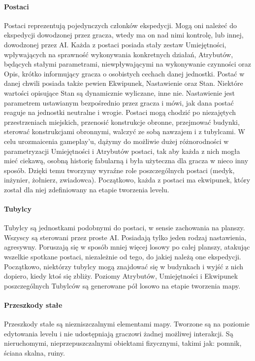 \documentclass[licencjacka]{pracamgr}
\begin{document}
    \paragraph{Postaci}
      Postaci reprezentują pojedynczych członków ekspedycji. Mogą oni należeć do ekspedycji dowodzonej przez gracza,
      wtedy ma on nad nimi kontrolę, lub innej, dowodzonej przez AI. Każda z postaci posiada stały zestaw Umiejętności,
      wpływających na sprawność wykonywania konkretnych działań, Atrybutów, będących stałymi parametrami, niewpływającymi
      na wykonywanie czynności oraz Opis, krótko informujący gracza o osobistych cechach danej jednostki. Postać w danej
      chwili posiada także pewien Ekwipunek, Nastawienie oraz Stan. Niektóre wartości opisujące Stan są dynamicznie wyliczane,
      inne nie. Nastawienie jest parametrem ustawianym bezpośrednio przez gracza i mówi, jak dana postać reaguje na jednostki
      neutralne i wrogie. Postaci mogą chodzić po niezajętych przestrzeniach miejskich, przenosić konstrukcje obronne,
      przejmować budynki, sterować konstrukcjami obronnymi, walczyć ze sobą nawzajem i z tubylcami. W celu urozmaicenia
      gameplay'u, dążymy do możliwie dużej różnorodności w parametryzacji Umiejętności i Atrybutów postaci, tak aby każda
      z nich mogła mieć ciekawą, osobną historię fabularną i była użyteczna dla gracza w nieco inny sposób. Dzięki temu
      tworzymy wyraźne role poszczególnych postaci (medyk, inżynier, żołnierz, zwiadowca). Początkowo, każda z postaci
      ma ekwipunek, który został dla niej zdefiniowany na etapie tworzenia levelu.
    \paragraph{Tubylcy}
      Tubylcy są jednostkami podobnymi do postaci, w sensie zachowania na planszy. Wszyscy są sterowani przez proste AI.
      Posiadają tylko jeden rodzaj nastawienia, agresywny. Poruszają się w sposób mniej więcej losowy po całej planszy,
      atakując wszelkie spotkane postaci, niezależnie od tego, do jakiej należą one ekspedycji. Początkowo,
      niektórzy tubylcy mogą znajdować się w budynkach i wyjść z nich dopiero, kiedy ktoś się zbliży. Poziomy Atrybutów,
      Umiejętności i Ekwipunek poszczególnych Tubylców są generowane pół losowo na etapie tworzenia mapy.
    \paragraph{Przeszkody stałe}
      Przeszkody stałe są niezniszczalnymi elementami mapy. Tworzone są na poziomie edytowania levelu i nie udostępniają
      graczowi żadnej możliwej interakcji. Są nieruchomymi, nieprzepuszczalnymi obiektami fizycznymi, takimi jak: pomnik,
      ściana skalna, ruiny.
\end{document}
